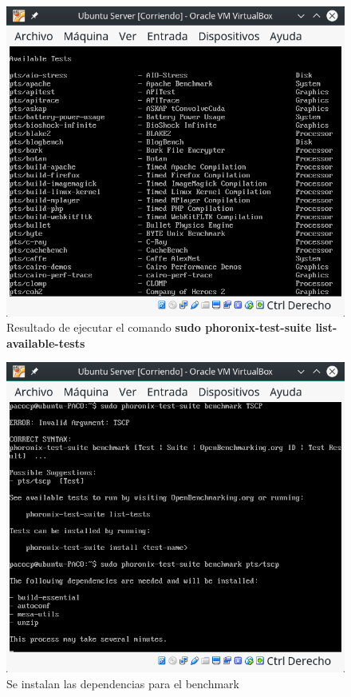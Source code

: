 \begin{figure}[H] %
	\centering
	\includegraphics[scale=0.5]{figuras/figura17.png}  %
	
	
	\caption{Resultado de ejecutar el comando \textbf{sudo phoronix-test-suite list-available-tests}}
	\label{figura17}
\end{figure}
\begin{figure}[H] %
	\centering
	\includegraphics[scale=0.5]{figuras/figura18.png}  %
	
	
	\caption{Se instalan las dependencias para el benchmark}
\label{figura18}
\end{figure}
